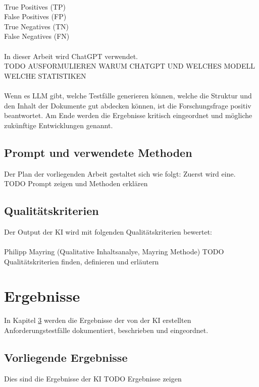 \documentclass[12pt,toc=bib,toc=listof]{scrreprt}
\begin{document}
\\
True Positives (TP)\\
False Positives (FP)\\
True Negatives (TN)\\ 
False Negatives (FN)\\
\\
In dieser Arbeit wird ChatGPT verwendet.\\
TODO AUSFORMULIEREN WARUM CHATGPT UND WELCHES MODELL WELCHE STATISTIKEN\\
\\
Wenn es LLM gibt, welche Testfälle generieren können, welche die Struktur und den Inhalt der Dokumente gut abdecken können, ist die Forschungsfrage positiv beantwortet. Am Ende werden die Ergebnisse kritisch eingeordnet und mögliche zukünftige Entwicklungen genannt.

\section{Prompt und verwendete Methoden} %
\label{sec:promptUndVerwendeteMethoden}
Der Plan der vorliegenden Arbeit gestaltet sich wie folgt: Zuerst wird eine.
TODO Prompt zeigen und Methoden erklären

\section{Qualitätskriterien} %
\label{sec:qualitätskriterien}
Der Output der KI wird mit folgenden Qualitätskriterien bewertet:\\
\\
Philipp Mayring (Qualitative Inhaltsanalye, Mayring Methode) 
TODO Qualitätskriterien finden, definieren und erläutern

\chapter{Ergebnisse} %
\label{sec:ergebnisse}
In Kapitel \ref{sec:ergebnisse} werden die Ergebnisse der von der KI erstellten Anforderungstestfälle dokumentiert, beschrieben und eingeordnet.

\section{Vorliegende Ergebnisse} %
\label{sec:vorliegendeErgebnisse}
Dies sind die Ergebnisse der KI
TODO Ergebnisse zeigen
\end{document}
